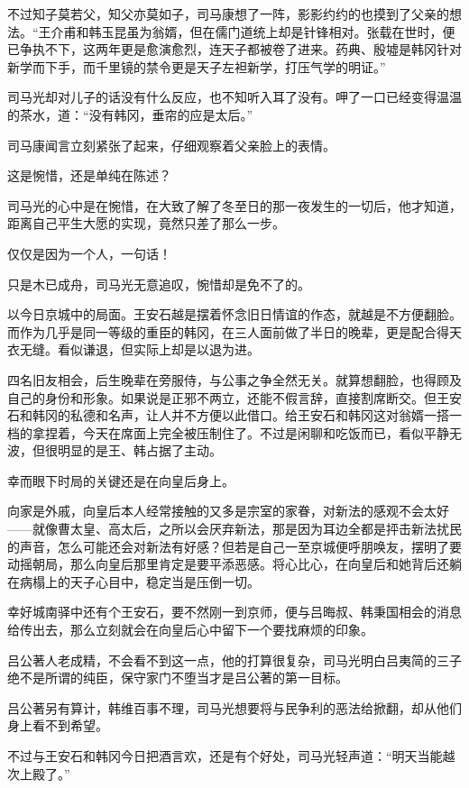 不过知子莫若父，知父亦莫如子，司马康想了一阵，影影约约的也摸到了父亲的想法。“王介甫和韩玉昆虽为翁婿，但在儒门道统上却是针锋相对。张载在世时，便已争执不下，这两年更是愈演愈烈，连天子都被卷了进来。药典、殷墟是韩冈针对新学而下手，而千里镜的禁令更是天子左袒新学，打压气学的明证。”

司马光却对儿子的话没有什么反应，也不知听入耳了没有。呷了一口已经变得温温的茶水，道：“没有韩冈，垂帘的应是太后。”

司马康闻言立刻紧张了起来，仔细观察着父亲脸上的表情。

这是惋惜，还是单纯在陈述？

司马光的心中是在惋惜，在大致了解了冬至日的那一夜发生的一切后，他才知道，距离自己平生大愿的实现，竟然只差了那么一步。

仅仅是因为一个人，一句话！

只是木已成舟，司马光无意追叹，惋惜却是免不了的。

以今日京城中的局面。王安石越是摆着怀念旧日情谊的作态，就越是不方便翻脸。而作为几乎是同一等级的重臣的韩冈，在三人面前做了半日的晚辈，更是配合得天衣无缝。看似谦退，但实际上却是以退为进。

四名旧友相会，后生晚辈在旁服侍，与公事之争全然无关。就算想翻脸，也得顾及自己的身份和形象。如果说是正邪不两立，还能不假言辞，直接割席断交。但王安石和韩冈的私德和名声，让人并不方便以此借口。给王安石和韩冈这对翁婿一搭一档的拿捏着，今天在席面上完全被压制住了。不过是闲聊和吃饭而已，看似平静无波，但很明显的是王、韩占据了主动。

幸而眼下时局的关键还是在向皇后身上。

向家是外戚，向皇后本人经常接触的又多是宗室的家眷，对新法的感观不会太好——就像曹太皇、高太后，之所以会厌弃新法，那是因为耳边全都是抨击新法扰民的声音，怎么可能还会对新法有好感？但若是自己一至京城便呼朋唤友，摆明了要动摇朝局，那么向皇后那里肯定是要平添恶感。将心比心，在向皇后和她背后还躺在病榻上的天子心目中，稳定当是压倒一切。

幸好城南驿中还有个王安石，要不然刚一到京师，便与吕晦叔、韩秉国相会的消息给传出去，那么立刻就会在向皇后心中留下一个要找麻烦的印象。

吕公著人老成精，不会看不到这一点，他的打算很复杂，司马光明白吕夷简的三子绝不是所谓的纯臣，保守家门不堕当才是吕公著的第一目标。

吕公著另有算计，韩维百事不理，司马光想要将与民争利的恶法给掀翻，却从他们身上看不到希望。

不过与王安石和韩冈今日把酒言欢，还是有个好处，司马光轻声道：“明天当能越次上殿了。”
